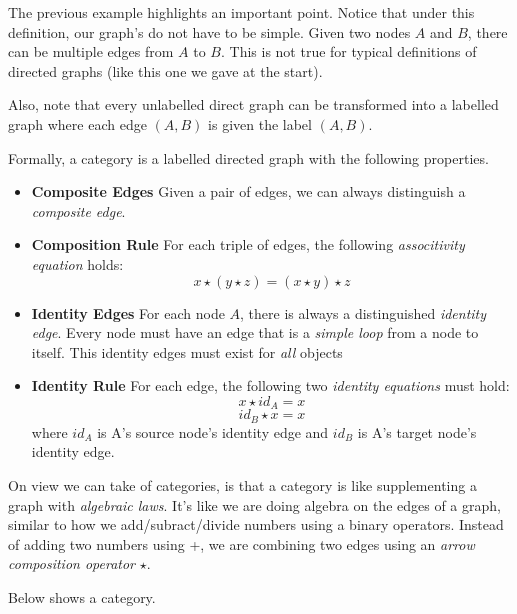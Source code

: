 The previous example highlights an important point. 
Notice that under this definition, our graph's do not have to be simple.
Given two nodes $A$ and $B$, there can be multiple edges from $A$ to $B$. 
This is not true for typical definitions of 
directed graphs (like this one we gave at the start).  

Also, note that every unlabelled direct graph can be 
transformed into a labelled graph 
where each edge $(A,B)$ is given the label $(A,B)$.



Formally, a category is a labelled directed graph 
with the following properties.

\begin{itemize}   
\renewcommand{\labelitemi}{$\Box$}
\item \textbf{Composite Edges} Given a pair of edges, we can always 
distinguish a \textit{composite edge}.
\item \textbf{Composition Rule} For each triple of edges, the following 
\textit{associtivity equation} holds: 
$$x \star (y \star z) = (x \star y) \star z$$
\item \textbf{Identity Edges} For each node $A$, there is always a 
distinguished \textit{identity edge}. Every node must have an edge that 
is a \textit{simple loop} from a node to itself. 
This identity edges must exist for \textit{all} objects
\item \textbf{Identity Rule} For each edge, the following two
\textit{identity equations} must hold: 
$$x \star id_A = x$$
$$id_B \star x = x$$
where $id_A$ is A's source node's identity edge and $id_B$ 
is A's target node's identity edge.
\end{itemize}

\frmrule

On view we can take of categories, is that a category is like 
supplementing a graph with \textit{algebraic laws}. 
It's like we are doing algebra on the edges of a graph, similar 
to how we add/subract/divide numbers using a binary operators.
Instead of adding two numbers using +, we are combining two edges using
an \textit{arrow composition operator} $\star$.  

\frmrule

\begin{example}
Below shows a category.


\end{example}

